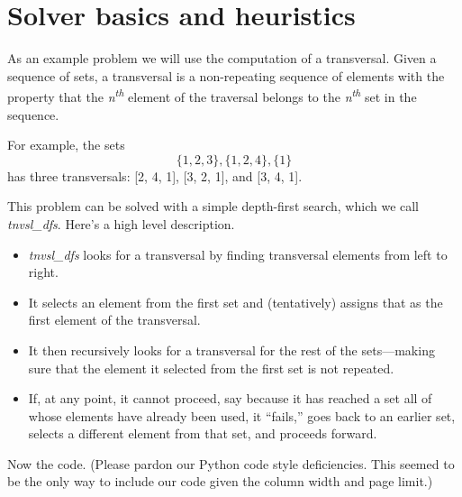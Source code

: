 \section{Solver basics and heuristics} \label{sec:solver-basics}

As an example problem we will use the computation of a transversal. Given a sequence of sets, a transversal is a non-repeating sequence of elements with the property that the \textit{n\textsuperscript{th}} element of the traversal belongs to the \textit{n\textsuperscript{th}} set in the sequence.  

For example, the sets \[\{1, 2, 3\}, \{1, 2, 4\}, \{1\}\] has three transversals: [2, 4, 1], [3, 2, 1], and [3, 4, 1]. 

This problem can be solved with a simple depth-first search, which we call \textit{tnvsl\_dfs}. Here's a high level description. 
\begin{itemize}
    \item \textit{tnvsl\_dfs} looks for a transversal by finding transversal elements from left to right.
    \item It selects an element from the first set and (tentatively) assigns that as the first element of the transversal.
    \item It then recursively looks for a transversal for the rest of the sets---making sure that the element it selected from the first set is not repeated.
    \item If, at any point, it cannot proceed, say because it has reached a set all of whose elements have already been used, it ``fails,'' goes back to an earlier set, selects a different element from that set, and proceeds forward.
\end{itemize}

Now the code. (Please pardon our Python code style deficiencies. This seemed to be the only way to include our code given the column width and page limit.)

